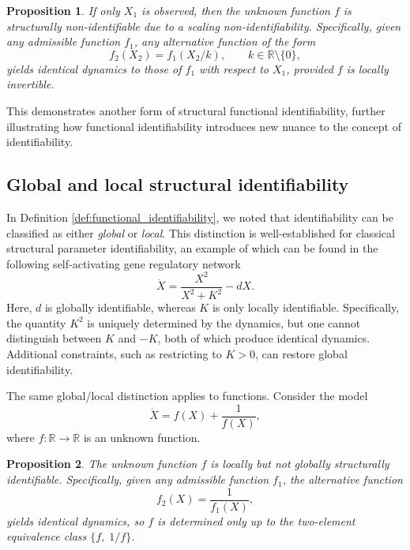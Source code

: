 \documentclass{article}
\theoremstyle{plain}
\newtheorem{proposition}{Proposition}[section]
\theoremstyle{definition}
\begin{document}
{\begin{proposition} \label{prop:pure_nonident}
If only $X_1$ is observed, then the unknown function $f$ is structurally non-identifiable due to a scaling non-identifiability. Specifically, given any admissible function $f_1$, any alternative function of the form
\begin{equation} \label{eq:pure_nonident_expr}
    f_2(X_2) = f_1(X_2/k), \qquad k\in\mathbb{R}\setminus\{0\},
\end{equation}
yields identical dynamics to those of $f_1$ with respect to $X_1$, provided $f$ is locally invertible.
\end{proposition}

This demonstrates another form of structural functional identifiability, further illustrating how functional identifiability introduces new nuance to the concept of identifiability.


\subsection{Global and local structural identifiability} \label{sec:local_global}
In Definition \ref{def:functional_identifiability}, we noted that identifiability can be classified as either \emph{global} or \emph{local}. This distinction is well-established for classical structural parameter identifiability, an example of which can be found in the following self-activating gene regulatory network
\begin{equation*}
    \dot{X} = \frac{X^2}{X^2 + K^2} - dX.
\end{equation*}
Here, $d$ is globally identifiable, whereas $K$ is only locally identifiable. Specifically, the quantity $K^2$ is uniquely determined by the dynamics, but one cannot distinguish between $K$ and $-K$, both of which produce identical dynamics. Additional constraints, such as restricting to $K>0$, can restore global identifiability.

The same global/local distinction applies to functions. Consider the model
\begin{equation}
    \label{eq:local_global_model}
    \dot{X} = f(X) + \frac{1}{f(X)},
\end{equation}
where $f:\mathbb{R}\to\mathbb{R}$ is an unknown function.

\begin{proposition} \label{prop:local_global}
The unknown function $f$ is locally but not globally structurally identifiable. Specifically, given any admissible function $f_1$, the alternative function
\begin{equation} \label{eq:local_global_nonident}
    f_2(X) = \frac{1}{f_1(X)},
\end{equation}
yields identical dynamics, so $f$ is determined only up to the two-element equivalence class $\{f,\; 1/f
\}$.
\end{proposition}

}
\end{document}
